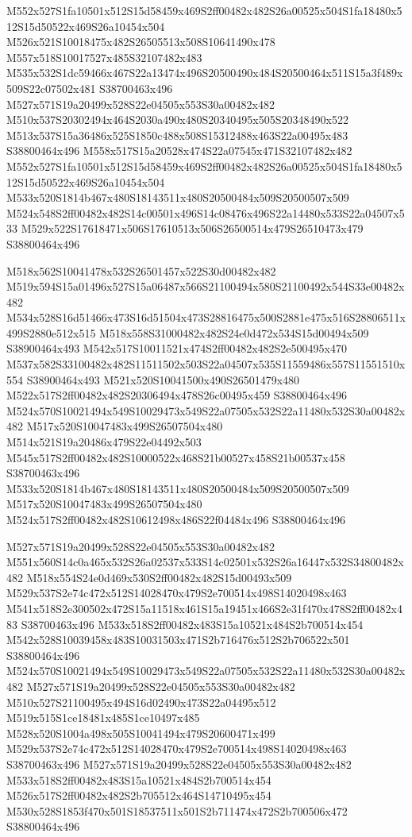 \documentclass{article}
\begin{document}
\begin{multicols}{2}
M552x527S1fa10501x512S15d58459x469S2ff00482x482S26a00525x504S1fa18480x512S15d50522x469S26a10454x504 M526x521S10018475x482S26505513x508S10641490x478 M557x518S10017527x485S32107482x483 M535x532S1dc59466x467S22a13474x496S20500490x484S20500464x511S15a3f489x509S22c07502x481 S38700463x496 M527x571S19a20499x528S22e04505x553S30a00482x482 M510x537S20302494x464S2030a490x480S20340495x505S20348490x522 M513x537S15a36486x525S1850c488x508S15312488x463S22a00495x483 S38800464x496 M558x517S15a20528x474S22a07545x471S32107482x482 M552x527S1fa10501x512S15d58459x469S2ff00482x482S26a00525x504S1fa18480x512S15d50522x469S26a10454x504 M533x520S1814b467x480S18143511x480S20500484x509S20500507x509 M524x548S2ff00482x482S14c00501x496S14c08476x496S22a14480x533S22a04507x533 M529x522S17618471x506S17610513x506S26500514x479S26510473x479 S38800464x496

M518x562S10041478x532S26501457x522S30d00482x482 M519x594S15a01496x527S15a06487x566S21100494x580S21100492x544S33e00482x482 M534x528S16d51466x473S16d51504x473S28816475x500S2881e475x516S28806511x499S2880e512x515 M518x558S31000482x482S24e0d472x534S15d00494x509 S38900464x493 M542x517S10011521x474S2ff00482x482S2e500495x470 M537x582S33100482x482S11511502x503S22a04507x535S11559486x557S11551510x554 S38900464x493 M521x520S10041500x490S26501479x480 M522x517S2ff00482x482S20306494x478S26c00495x459 S38800464x496 M524x570S10021494x549S10029473x549S22a07505x532S22a11480x532S30a00482x482 M517x520S10047483x499S26507504x480 M514x521S19a20486x479S22e04492x503 M545x517S2ff00482x482S10000522x468S21b00527x458S21b00537x458 S38700463x496 M533x520S1814b467x480S18143511x480S20500484x509S20500507x509 M517x520S10047483x499S26507504x480 M524x517S2ff00482x482S10612498x486S22f04484x496 S38800464x496

M527x571S19a20499x528S22e04505x553S30a00482x482 M551x560S14c0a465x532S26a02537x533S14c02501x532S26a16447x532S34800482x482 M518x554S24e0d469x530S2ff00482x482S15d00493x509 M529x537S2e74c472x512S14028470x479S2e700514x498S14020498x463 M541x518S2e300502x472S15a11518x461S15a19451x466S2e31f470x478S2ff00482x483 S38700463x496 M533x518S2ff00482x483S15a10521x484S2b700514x454 M542x528S10039458x483S10031503x471S2b716476x512S2b706522x501 S38800464x496 M524x570S10021494x549S10029473x549S22a07505x532S22a11480x532S30a00482x482 M527x571S19a20499x528S22e04505x553S30a00482x482 M510x527S21100495x494S16d02490x473S22a04495x512 M519x515S1ce18481x485S1ce10497x485 M528x520S1004a498x505S10041494x479S20600471x499 M529x537S2e74c472x512S14028470x479S2e700514x498S14020498x463 S38700463x496 M527x571S19a20499x528S22e04505x553S30a00482x482 M533x518S2ff00482x483S15a10521x484S2b700514x454 M526x517S2ff00482x482S2b705512x464S14710495x454 M530x528S1853f470x501S18537511x501S2b711474x472S2b700506x472 S38800464x496


\end{multicols}
\end{document}
